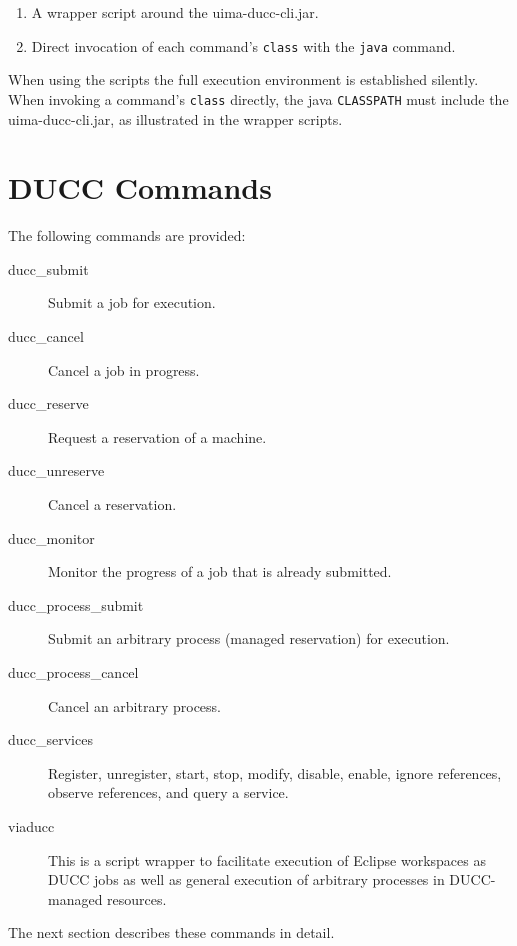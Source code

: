     \begin{enumerate}
      \item A wrapper script around the uima-ducc-cli.jar.
      \item Direct invocation of each command's {\tt class} with the {\tt java} command.
    \end{enumerate}

    When using the scripts the full execution environment is established
    silently.  When invoking a command's {\tt class} directly, the java {\tt CLASSPATH}
    must include the uima-ducc-cli.jar, as illustrated in the wrapper scripts.

    \section{DUCC Commands}
    The following commands are provided:
    \begin{description}
    \item[ducc\_submit] Submit a job for execution.
    \item[ducc\_cancel] Cancel a job in progress.
    \item[ducc\_reserve] Request a reservation of a machine.
    \item[ducc\_unreserve] Cancel a reservation.
    \item[ducc\_monitor] Monitor the progress of a job that is already submitted.
    \item[ducc\_process\_submit] Submit an arbitrary process (managed reservation) for execution.
    \item[ducc\_process\_cancel] Cancel an arbitrary process.
    \item[ducc\_services] Register, unregister, start, stop, modify, disable, enable, 
      ignore references, observe references, and query a service.
    \item[viaducc] This is a script wrapper to facilitate execution of Eclipse workspaces as
      DUCC jobs as well as general execution of arbitrary processes in DUCC-managed resources.
    \end{description}
    
    The next section describes these commands in detail.

    
    
    
    
    
    
    
    
	    
